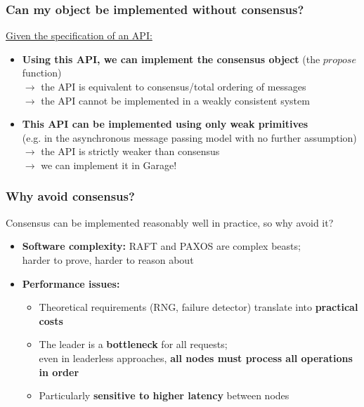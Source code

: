 \documentclass[aspectratio=169]{beamer}
\begin{document}
\begin{frame}
	\frametitle{Can my object be implemented without consensus?}
	\underline{Given the specification of an API:}
	\vspace{2em}
	\begin{itemize}
		\item \textbf{Using this API, we can implement the consensus object} (the $propose$ function)\\
			$\to$ the API is equivalent to consensus/total ordering of messages\\
			$\to$ the API cannot be implemented in a weakly consistent system
			\vspace{2em}
		\item<2-> \textbf{This API can be implemented using only weak primitives}\\
			(e.g. in the asynchronous message passing model with no further assumption)\\
			$\to$ the API is strictly weaker than consensus\\
			$\to$ we can implement it in Garage!
	\end{itemize}
\end{frame}

\begin{frame}
	\frametitle{Why avoid consensus?}
	Consensus can be implemented reasonably well in practice, so why avoid it?
	\vspace{2em}
	\begin{itemize}
		\item \textbf{Software complexity:} RAFT and PAXOS are complex beasts;\\
			harder to prove, harder to reason about
			\vspace{1.5em}
		\item \textbf{Performance issues:}
			\vspace{1em}
			\begin{itemize}
				\item Theoretical requirements (RNG, failure detector) translate into \textbf{practical costs}
					\vspace{1em}
				\item The leader is a \textbf{bottleneck} for all requests;\\
					even in leaderless approaches, \textbf{all nodes must process all operations in order}
					\vspace{1em}
				\item Particularly \textbf{sensitive to higher latency} between nodes
			\end{itemize}
	\end{itemize}
\end{frame}
\end{document}
